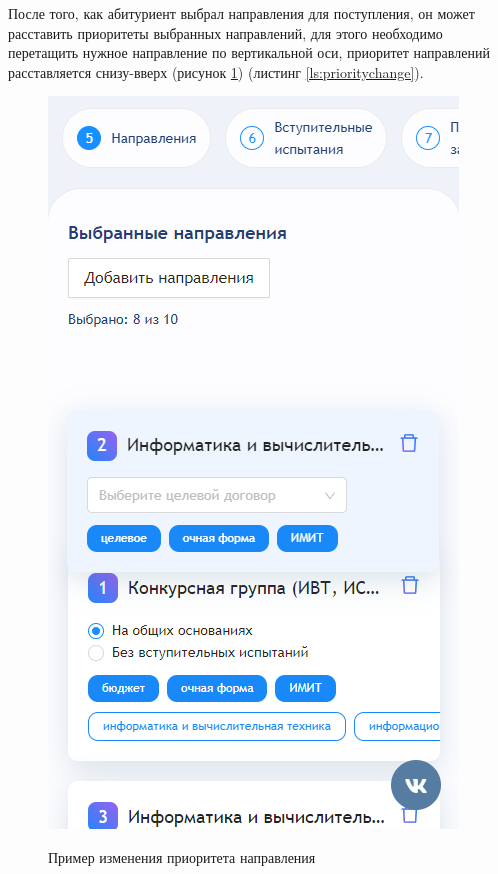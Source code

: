 После того, как абитуриент выбрал направления для поступления, он может расставить приоритеты выбранных направлений, для этого необходимо перетащить нужное направление по вертикальной оси, приоритет направлений расставляется снизу-вверх (рисунок \ref{fig:changepriority}) (листинг \ref{ls:prioritychange}).

\begin{figure}[H]
\begin{center}
\includegraphics[width=0.5\hsize]{fig/change-priority-programs.png}\\[2mm]
\caption{Пример изменения приоритета направления}\label{fig:changepriority}
\end{center}
\end{figure}

